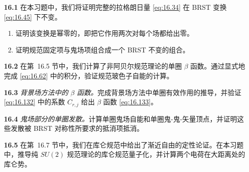 \problems

\textbf{16.1} 在本习题中，我们将证明完整的拉格朗日量 \eqref{eq:16.34} 在 BRST 变换 \eqref{eq:16.45} 下不变。
\begin{enumerate}[label=(\alph*)]
  \item 证明该变换是幂零的，即把它作用两次对每个场都给出零。
  \item 证明规范固定项与鬼场项组合成一个 BRST 不变的组合。
\end{enumerate}

\textbf{16.2} 在第~16.5 节中，我们计算了非阿贝尔规范理论的单圈 $\beta$ 函数。通过显式地完成 \eqref{eq:16.62} 中的积分，验证规范玻色子自能的计算。

\textbf{16.3} \emph{背景场方法中的 $\beta$ 函数。}完成背景场方法中单圈有效作用的推导，并验证 \eqref{eq:16.132} 中的系数 $C_{r,j}$ 给出 $\beta$ 函数 \eqref{eq:16.133}。

\textbf{16.4} \emph{鬼场部分的单圈发散。}计算单圈鬼场自能和单圈鬼-鬼-矢量顶点，并证明这些发散被 BRST 对称性所要求的抵消项抵消。

\textbf{16.5} 在第~16.7 节中，我们在库仑规范中给出了渐近自由的定性论证。在本习题中，推导纯 $SU(2)$ 规范理论的库仑规范量子化，并计算两个电荷在大距离处的库仑势。
